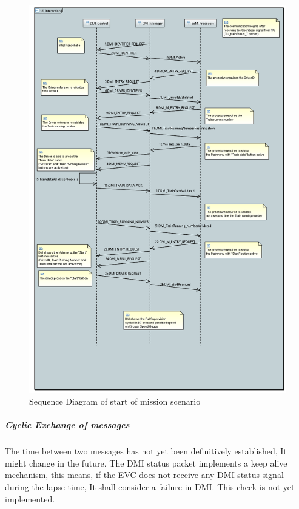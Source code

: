   \begin{figure}
  \centering
  \includegraphics[scale=0.45]{images/SeqDia_DMIctr_DMImng_SoMproc}
  \caption{Sequence Diagram of start of mission scenario}\label{fig:SeqDiaSoM}
  \end{figure}
  

\subparagraph{ Cyclic Exchange of messages}
The time between two messages has not yet been definitively established, It might change in the future. The DMI status packet implements a keep alive mechanism, this means, if the EVC does not receive any DMI status signal during the lapse time, It shall consider a failure in DMI. This check is not yet implemented.

